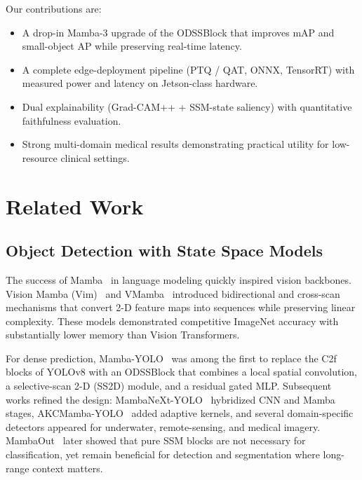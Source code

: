 \documentclass[10pt,twocolumn,letterpaper]{article}
\begin{document}
Our contributions are:
\begin{itemize}[leftmargin=*,itemsep=1pt,topsep=2pt]
  \item A drop-in Mamba-3 upgrade of the ODSSBlock that improves mAP and small-object AP while preserving real-time latency.
  \item A complete edge-deployment pipeline (PTQ / QAT, ONNX, TensorRT) with measured power and latency on Jetson-class hardware.
  \item Dual explainability (Grad-CAM++ + SSM-state saliency) with quantitative faithfulness evaluation.
  \item Strong multi-domain medical results demonstrating practical utility for low-resource clinical settings.
\end{itemize}

\section{Related Work}
\label{sec:related}

\subsection{Object Detection with State Space Models}
The success of Mamba~\cite{gu2023mamba} in language modeling quickly inspired vision backbones. Vision Mamba (Vim)~\cite{zhu2024vision} and VMamba~\cite{liu2024vmamba} introduced bidirectional and cross-scan mechanisms that convert 2-D feature maps into sequences while preserving linear complexity. These models demonstrated competitive ImageNet accuracy with substantially lower memory than Vision Transformers.

For dense prediction, Mamba-YOLO~\cite{wang2025mambayolo} was among the first to replace the C2f blocks of YOLOv8 with an ODSSBlock that combines a local spatial convolution, a selective-scan 2-D (SS2D) module, and a residual gated MLP. Subsequent works refined the design: MambaNeXt-YOLO~\cite{lei2025mambanext} hybridized CNN and Mamba stages, AKCMamba-YOLO~\cite{chen2026akcmamba} added adaptive kernels, and several domain-specific detectors appeared for underwater, remote-sensing, and medical imagery. MambaOut~\cite{yu2025mambaout} later showed that pure SSM blocks are not necessary for classification, yet remain beneficial for detection and segmentation where long-range context matters.
\end{document}
